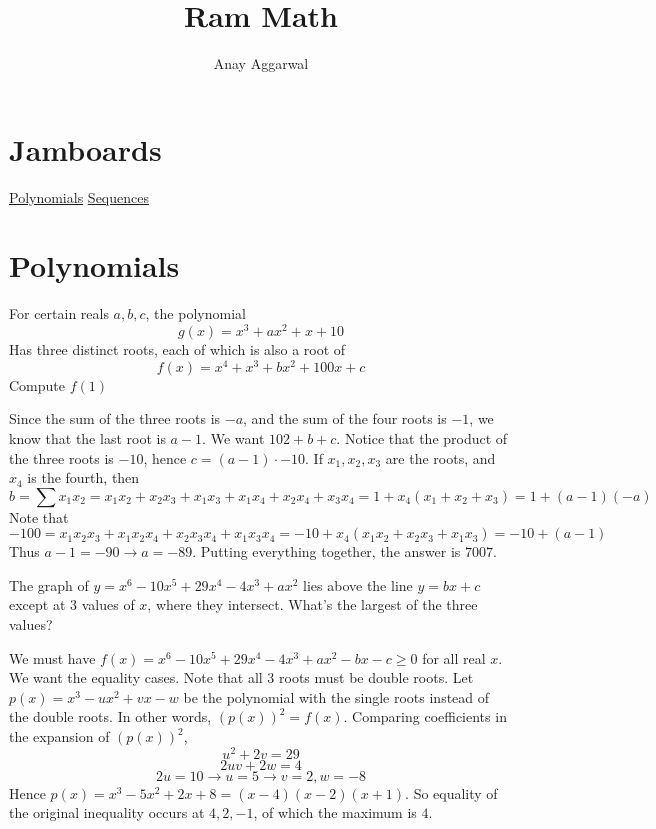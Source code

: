\documentclass[11pt]{scrartcl}
\title{Ram Math}
\author{Anay Aggarwal}
\begin{document}
\maketitle
\section{Jamboards}
\href{https://jamboard.google.com/d/1GIAwYaI3D2N-1IsQxEpHmhRcS8Xmtpmddfsv4TQs4aI/viewer?f=0}{Polynomials}
\href{https://jamboard.google.com/d/19rOMbfaiDwznnhI\_ThHDppNTJ5jnILQ0X0QbMevKajE/viewer}{Sequences}
\section{Polynomials}
\begin{example}
  [AMC 12 2017]
  For certain reals $a,b,c$, the polynomial
  $$g(x)=x^3+ax^2+x+10$$
  Has three distinct roots, each of which is also a root of
  $$f(x)=x^4+x^3+bx^2+100x+c$$
  Compute $f(1)$
\end{example}
\begin{soln}
  Since the sum of the three roots is $-a$, and the sum of the four roots is $-1$, we know that the last root is $a-1$.
  We want $102+b+c$. Notice that the product of the three roots is $-10$, hence $c=(a-1)\cdot -10$.
  If $x_1, x_2, x_3$ are the roots, and $x_4$ is the fourth, then
  $$b=\sum x_1x_2=x_1x_2+x_2x_3+x_1x_3+x_1x_4+x_2x_4+x_3x_4=1+x_4(x_1+x_2+x_3)=1+(a-1)(-a)$$
  Note that
  $$-100=x_1x_2x_3+x_1x_2x_4+x_2x_3x_4+x_1x_3x_4=-10+x_4(x_1x_2+x_2x_3+x_1x_3)=-10+(a-1)$$
  Thus $a-1=-90\to a=-89$. Putting everything together, the answer is $7007$.
\end{soln}
\begin{example}
  [AMC 12 2010]
  The graph of $y=x^6-10x^5+29x^4-4x^3+ax^2$ lies above the line $y=bx+c$
  except at $3$ values of $x$, where they intersect. What's the largest of
  the three values?
\end{example}
\begin{soln}
  We must have $f(x)=x^6-10x^5+29x^4-4x^3+ax^2-bx-c\ge 0$ for all real $x$. We want the equality cases.
Note that all $3$ roots must be double roots. Let $p(x)=x^3-ux^2+vx-w$ be the polynomial with the single roots instead of the double roots.
In other words, $(p(x))^2=f(x)$. Comparing coefficients in the expansion of $(p(x))^2$,
$$u^2+2v=29$$
$$2uv+2w=4$$
$$2u=10\to u=5\to v=2, w=-8$$
Hence $p(x)=x^3-5x^2+2x+8=(x-4)(x-2)(x+1)$. So equality of the original inequality
occurs at $4,2,-1$, of which the maximum is $4$.
\end{soln}
\end{document}
